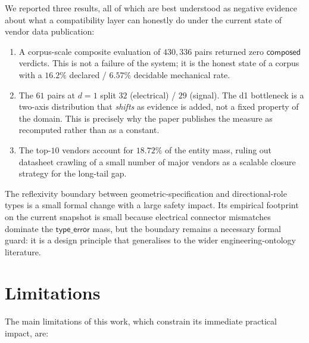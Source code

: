 \documentclass[review]{elsarticle}
\begin{document}
We reported three results, all of which are best understood as
negative evidence about what a compatibility layer can honestly do
under the current state of vendor data publication:

\begin{enumerate}[nosep]
\item A corpus-scale composite evaluation of $430{,}336$ pairs
returned zero $\mathsf{composed}$ verdicts. This is not a failure of
the system; it is the honest state of a corpus with a $16.2\%$
declared / $6.57\%$ decidable mechanical rate.

\item The $61$ pairs at $d=1$ split $32$ (electrical) / $29$
(signal). The d1 bottleneck is a two-axis distribution that
\emph{shifts} as evidence is added, not a fixed property of the
domain. This is precisely why the paper publishes the measure as
recomputed rather than as a constant.

\item The top-$10$ vendors account for $18.72\%$ of the entity mass,
ruling out datasheet crawling of a small number of major vendors as
a scalable closure strategy for the long-tail gap.
\end{enumerate}

The reflexivity boundary between geometric-specification and
directional-role types is a small formal change with a large safety
impact. Its empirical footprint on the current snapshot is small
because electrical connector mismatches dominate the $\mathsf{type\_error}$
mass, but the boundary remains a necessary formal guard: it is a
design principle that generalises to the wider engineering-ontology
literature.

\section{Limitations}

The main limitations of this work, which constrain its immediate
practical impact, are:
\end{document}
